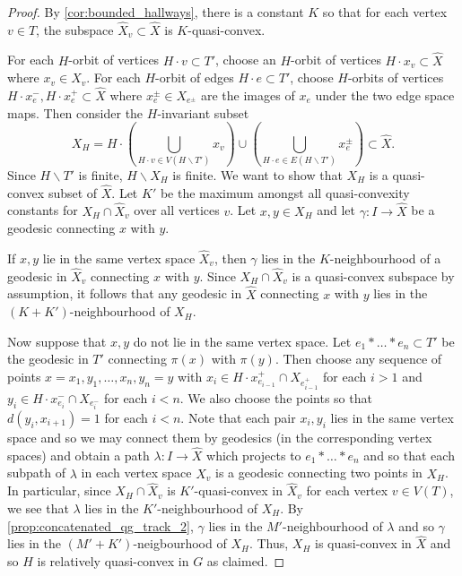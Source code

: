 \documentclass[11pt, a4paper]{amsart}
\theoremstyle{definition}
\newcommand{\wh}[1]{\widehat{ #1 }}
\begin{document}
\begin{proof}
By \cref{cor:bounded_hallways}, there is a constant $K$ so that for each vertex $v\in T$, the subspace $\widehat{X}_v\subset \widehat{X}$ is $K$-quasi-convex. 

For each $H$-orbit of vertices $H\cdot v\subset T'$, choose an $H$-orbit of vertices $H\cdot x_v\subset \wh{X}$ where $x_v\in X_v$. For each $H$-orbit of edges $H\cdot e\subset T'$, choose $H$-orbits of vertices $H\cdot x_{e}^-, H\cdot x_{e}^+\subset \wh{X}$ where $x_e^{\pm}\in X_{e^{\pm}}$ are the images of $x_e$ under the two edge space maps. Then consider the $H$-invariant subset
\[
X_H = H\cdot \left(\bigcup_{H\cdot v\in V(H\backslash T')}x_v\right)\cup\left(\bigcup_{H\cdot e\in E(H\backslash T')}x_e^{\pm}\right)\subset \wh{X}.
\]
Since $H\backslash T'$ is finite, $H\backslash X_H$ is finite. We want to show that $X_H$ is a quasi-convex subset of $\wh{X}$. Let $K'$ be the maximum amongst all quasi-convexity constants for $X_H\cap \wh{X}_v$ over all vertices $v$. Let $x, y\in X_H$ and let $\gamma\colon I\to\wh{X}$ be a geodesic connecting $x$ with $y$. 

If $x, y$ lie in the same vertex space $\wh{X}_v$, then $\gamma$ lies in the $K$-neighbourhood of a geodesic in $\wh{X}_v$ connecting $x$ with $y$. Since $X_H\cap \wh{X}_v$ is a quasi-convex subspace by assumption, it follows that any geodesic in $\wh{X}$ connecting $x$ with $y$ lies in the $(K+K')$-neighbourhood of $X_H$.

Now suppose that $x, y$ do not lie in the same vertex space. Let $e_1*\ldots *e_n\subset T'$ be the geodesic in $T'$ connecting $\pi(x)$ with $\pi(y)$. Then choose any sequence of points $x = x_1, y_1, \ldots, x_n, y_n = y$ with $x_i\in H\cdot x_{e_{i-1}}^+\cap X_{e_{i-1}^+}$ for each $i>1$ and $y_i\in H\cdot x_{e_{i}}^-\cap X_{e_{i}^-}$ for each $i<n$. We also choose the points so that $d(y_i,x_{i+1}) = 1$ for each $i<n$. Note that each pair $x_i, y_i$ lies in the same vertex space and so we may connect them by geodesics (in the corresponding vertex spaces) and obtain a path $\lambda\colon I \to \wh{X}$ which projects to $e_1*\ldots *e_n$ and so that each subpath of $\lambda$ in each vertex space $\wh{X}_v$ is a geodesic connecting two points in $X_H$. In particular, since $X_H\cap \wh{X}_v$ is $K'$-quasi-convex in $\wh{X}_v$ for each vertex $v\in V(T)$, we see that $\lambda$ lies in the $K'$-neighbourhood of $X_H$. By \cref{prop:concatenated_qg_track_2}, $\gamma$ lies in the $M'$-neighbourhood of $\lambda$ and so $\gamma$ lies in the $(M'+K')$-neigbourhood of $X_H$. Thus, $X_H$ is quasi-convex in $\wh{X}$ and so $H$ is relatively quasi-convex in $G$ as claimed.
\end{proof}
\end{document}
